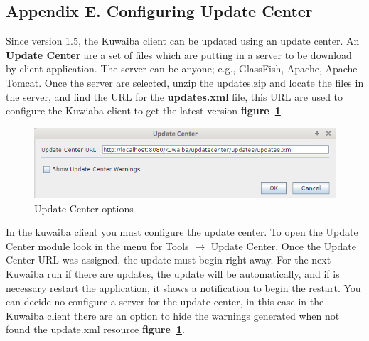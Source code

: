 \documentclass[a4paper]{article}
\begin{document}
\begin{appendices}
			\section{Appendix E. Configuring Update Center} \label{app:AppendixE}
			Since version 1.5, the Kuwaiba client can be updated using an update center. An \textbf{Update Center} are a set of files which are putting in a server to be download by client application. The server can be anyone; e.g., GlassFish, Apache, Apache Tomcat. Once the server are selected, unzip the updates.zip and locate the files in the server, and find the URL for the \textbf{updates.xml} file, this URL are used to configure the Kuwiaba client to get the latest version \textbf{figure~\ref{fig:update_center_options}}.
			
			\begin{figure}[h!]
				\centering
				\includegraphics[width=0.7\linewidth]{img/update_center.png}
				\caption{Update Center options}
				\label{fig:update_center_options}
			\end{figure}
						
			In the kuwaiba client you must configure the update center. To open the Update Center module look in the menu for Tools $\rightarrow$ Update Center. Once the Update Center URL was assigned, the update must begin right away. For the next Kuwaiba run if there are updates, the update will be automatically, and if is necessary restart the application, it shows a notification to begin the restart.
			\newline
			\newline
			You can decide no configure a server for the update center, in this case in the Kuwaiba client there are an option to hide the warnings generated when not found the update.xml resource  \textbf{figure~\ref{fig:update_center_options}}.					
			
		\end{appendices}			
\end{document}
